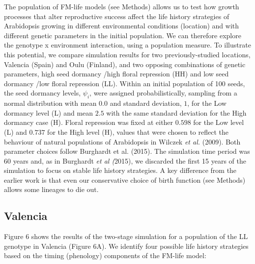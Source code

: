 \documentclass[phd]{infthesis}
\begin{document}
The population of FM-life models (see Methods) allows us to test how
growth processes that alter reproductive success affect the life history
strategies of Arabidopsis growing in different environmental conditions
(location) and with different genetic parameters in the initial
population. We can therefore explore the genotype x environment
interaction, using a population measure. To illustrate this potential,
we compare simulation results for two previously-studied locations,
Valencia (Spain) and Oulu (Finland), and two opposing combinations of
genetic parameters, high seed dormancy /high floral repression (HH) and
low seed dormancy /low floral repression (LL). Within an initial
population of 100 seeds, the seed dormancy levels, \(\psi_{i}\), were
assigned probabilistically, sampling from a normal distribution with
mean \(0.0\) and standard deviation, \(1\), for the Low dormancy level
(L) and mean \(2.5\) with the same standard deviation for the High
dormancy case (H). Floral repression was fixed at either \(0.598\) for
the Low level (L) and \(0.737\) for the High level (H), values that were
chosen to reflect the behaviour of natural populations of Arabidopsis in
Wilczek \emph{et al.} (2009). Both parameter choices follow Burghardt et
al. (2015). The simulation time period was 60 years and, as in Burghardt
\emph{et al (}2015), we discarded the first 15 years of the simulation
to focus on stable life history strategies. A key difference from the
earlier work is that even our conservative choice of birth function (see
Methods) allows some lineages to die out.

\subsection{Valencia}
\label{valencia}

Figure 6 shows the results of the two-stage simulation for a population
of the LL genotype in Valencia (Figure 6A). We identify four possible
life history strategies based on the timing (phenology) components of
the FM-life model:
\end{document}

